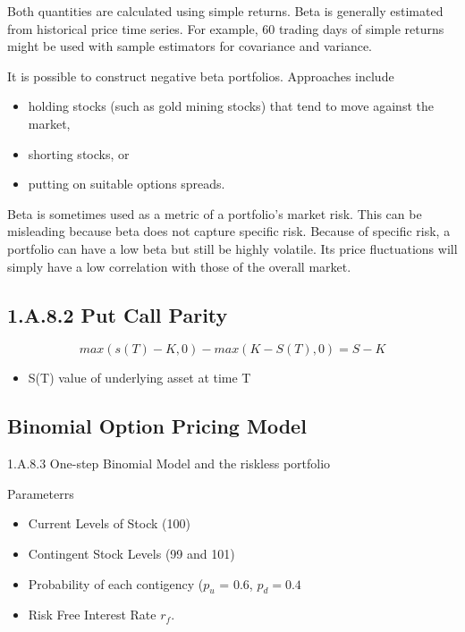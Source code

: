 Both quantities are calculated using simple returns. Beta is generally estimated from historical price time series. For example, 60 trading days of simple returns might be used with sample estimators for covariance and variance.

It is possible to construct negative beta portfolios. Approaches include 

\begin{itemize}

    \item  holding stocks (such as gold mining stocks) that tend to move against the market,

    \item  shorting stocks, or

    \item  putting on suitable options spreads.

\end{itemize} 

Beta is sometimes used as a metric of a portfolio's market risk. This can be misleading because beta does not capture specific risk. Because of specific risk, a portfolio can have a low beta but still be highly volatile. Its price fluctuations will simply have a low correlation with those of the overall market.





\subsection*{1.A.8.2 Put Call Parity}

\[max(s(T) - K,0) - max(K-S(T),0) = S-K\]

\begin{itemize}
\item S(T) value of underlying asset at time T
\end{itemize}

\subsection*{Binomial Option Pricing Model}


1.A.8.3 One-step Binomial Model and the riskless portfolio


Parameterrs
\begin{itemize}
\item Current Levels of Stock (100)
\item Contingent Stock Levels (99 and 101)
\item Probability of each contigency ($p_u$ = 0.6, $p_d = 0.4$
\item Risk Free Interest Rate $r_f$.
\end{itemize}


